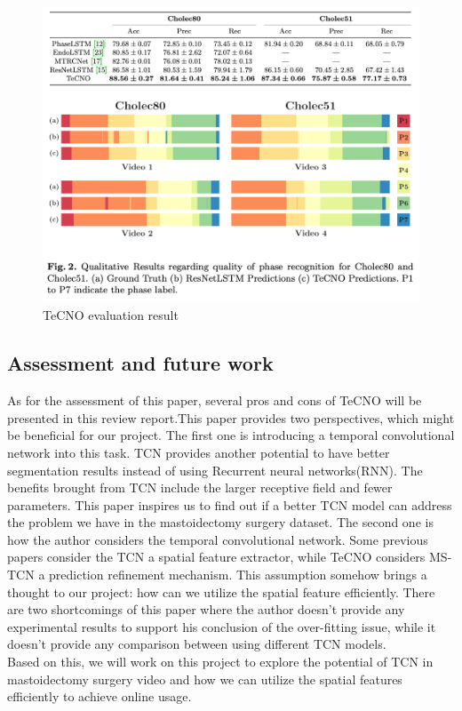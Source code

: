 \documentclass[11pt]{article} \usepackage[top=1in, bottom=1in, left=1in, right=1in]{geometry}
\begin{document}
\begin{figure}[H]
  \includegraphics[scale = 0.8]{TeCNO_res.png}
  \centering
  \caption{ TeCNO evaluation result \cite{TeCNO}}
  \label{fig:tecno_res}
\end{figure}
\subsection{Assessment and future work}
As for the assessment of this paper, several pros and cons of TeCNO will be presented in this review report.This paper provides two perspectives, which might be beneficial for our project. The first one is introducing a temporal convolutional network into this task. TCN provides another potential to have better segmentation results instead of using Recurrent neural networks(RNN). The benefits brought from TCN include the larger receptive field and fewer parameters. This paper inspires us to find out if a better TCN model can address the problem we have in the mastoidectomy surgery dataset. The second one is how the author considers the temporal convolutional network. Some previous papers consider the TCN a spatial feature extractor, while TeCNO considers MS-TCN a prediction refinement mechanism. This assumption somehow brings a thought to our project: how can we utilize the spatial feature efficiently. There are two shortcomings of this paper where the author doesn't provide any experimental results to support his conclusion of the over-fitting issue, while it doesn't provide any comparison between using different TCN models.\\ 
Based on this, we will work on this project to explore the potential of TCN in mastoidectomy surgery video and how we can utilize the spatial features efficiently to achieve online usage. 
\end{document}
